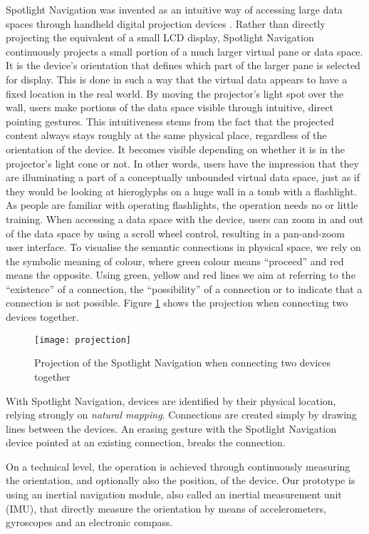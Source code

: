 Spotlight Navigation was invented as an intuitive way of accessing large data spaces through handheld digital projection devices \cite{Rapp2010,VanderVlist2012a}. Rather than directly projecting the equivalent of a small LCD display, Spotlight Navigation continuously projects a small portion of a much larger virtual pane or data space. It is the device's orientation that defines which part of the larger pane is selected for display. This is done in such a way that the virtual data appears to have a fixed location in the real world. By moving the projector's light spot over the wall, users make portions of the data space visible through intuitive, direct pointing gestures. This intuitiveness stems from the fact that the projected content always stays roughly at the same physical place, regardless of the orientation of the device. It becomes visible depending on whether it is in the projector's light cone or not. In other words, users have the impression that they are illuminating a part of a conceptually unbounded virtual data space, just as if they would be looking at hieroglyphs on a huge wall in a tomb with a flashlight. As people are familiar with operating flashlights, the operation needs no or little training. When accessing a data space with the device, users can zoom in and out of the data space by using a scroll wheel control, resulting in a pan-and-zoom user interface. To visualise the semantic connections in physical space, we rely on the symbolic meaning of colour, where green colour means ``proceed'' and red means the opposite. Using green, yellow and red lines we aim at referring to the ``existence'' of a connection, the ``possibility'' of a connection or to indicate that a connection is not possible. Figure \ref{projection} shows the projection when connecting two devices together.


\begin{figure}
\centering
\texttt{[image: projection]}
\caption{Projection of the Spotlight Navigation when connecting two devices together}
\label{projection}
\end{figure}

With Spotlight Navigation, devices are identified by their physical location, relying strongly on \emph{natural mapping}. Connections are created simply by drawing lines between the devices. An erasing gesture with the Spotlight Navigation device pointed at an existing connection, breaks the connection. 

On a technical level, the operation is achieved through continuously measuring the orientation, and optionally also the position, of the device. Our prototype is using an inertial navigation module, also called an inertial measurement unit (IMU), that directly measure the orientation by means of accelerometers, gyroscopes and an electronic compass.

